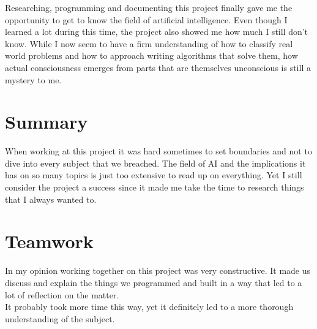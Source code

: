 %
%
%
%

\def\Title{Reflection}
\def\Author{Michael Gerber}
\def\Date{\today}







\maketitle %

Researching, programming and documenting this project finally gave me the opportunity to get to know the field of artificial intelligence. Even though I learned a lot during this time, the project also showed me how much I still don't know. While I now seem to have a firm understanding of how to classify real world problems and how to approach writing algorithms that solve them, how actual consciousness emerges from parts that are themselves unconscious is still a mystery to me.

\section*{Summary}
When working at this project it was hard sometimes to set boundaries and not to dive into every subject that we breached. The field of AI and the implications it has on so many topics is just too extensive to read up on everything. Yet I still consider the project a success since it made me take the time to research things that I always wanted to.

\section*{Teamwork}
In my opinion working together on this project was very constructive. It made us discuss and explain the things we programmed and built in a way that led to a lot of reflection on the matter.\medskip\\
It probably took more time this way, yet it definitely led to a more thorough understanding of the subject.

